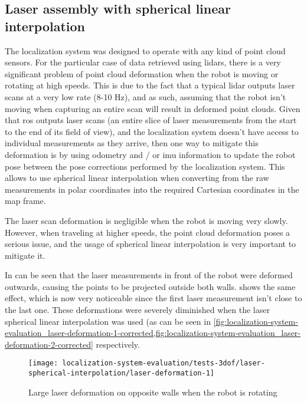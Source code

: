 \subsection{Laser assembly with spherical linear interpolation}

The localization system was designed to operate with any kind of point cloud sensors. For the particular case of data retrieved using \glspl{lidar}, there is a very significant problem of point cloud deformation when the robot is moving or rotating at high speeds. This is due to the fact that a typical \gls{lidar} outputs laser scans at a very low rate (8-10 Hz), and as such, assuming that the robot isn't moving when capturing an entire scan will result in deformed point clouds. Given that \gls{ros} outputs laser scans (an entire slice of laser measurements from the start to the end of its field of view), and the localization system doesn't have access to individual measurements as they arrive, then one way to mitigate this deformation is by using odometry and / or \gls{imu} information to update the robot pose between the pose corrections performed by the localization system. This allows to use spherical linear interpolation when converting from the raw measurements in polar coordinates into the required Cartesian coordinates in the map frame.

The laser scan deformation is negligible when the robot is moving very slowly. However, when traveling at higher speeds, the point cloud deformation poses a serious issue, and the usage of spherical linear interpolation is very important to mitigate it.

In  can be seen that the laser measurements in front of the robot were deformed outwards, causing the points to be projected outside both walls.  shows the same effect, which is now very noticeable since the first laser measurement isn't close to the last one. These deformations were severely diminished when the laser spherical linear interpolation was used (as can be seen in \cref{fig:localization-system-evaluation_laser-deformation-1-corrected,fig:localization-system-evaluation_laser-deformation-2-corrected} respectively.


\begin{figure}[ht]
	\centering
	\texttt{[image: localization-system-evaluation/tests-3dof/laser-spherical-interpolation/laser-deformation-1]}
	\caption{Large laser deformation on opposite walls when the robot is rotating}
	\label{fig:localization-system-evaluation_laser-deformation-1}
\end{figure}


